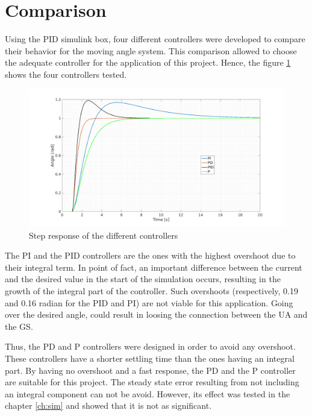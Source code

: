 \section{Comparison}
Using the PID simulink box, four different controllers were developed to compare their behavior for the moving angle system. This comparison allowed to choose the adequate controller for the application of this project. Hence, the figure \ref{fig:comp_pid} shows the four controllers tested.

\begin{figure}[H]
\centerline{
\includegraphics[scale=0.35]{figures/full_comp.png}}
\caption{Step response of the different controllers}
\label{fig:comp_pid}
\end{figure}

The PI and the PID controllers are the ones with the highest overshoot due to their integral term. In point of fact, an important difference between the current and the desired value in the start of the simulation occurs, resulting in the growth of the integral part of the controller. 
Such overshoots (respectively, 0.19 and 0.16 radian for the PID and PI) are not viable for this application. Going over the desired angle, could result in loosing the connection between the UA and the GS.

Thus, the PD and P controllers were designed in order to avoid any overshoot. These controllers have a shorter settling time than the ones having an integral part. By having no overshoot and a fast response, the PD and the P controller are suitable for this project. The steady state error resulting from not including an integral component can not be avoid. However, its effect was tested in the chapter \ref{ch:sim} and showed that it is not as significant.

\vspace{5mm}

